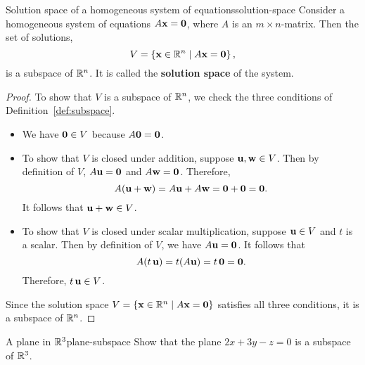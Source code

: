 \begin{proposition}{Solution space of a homogeneous system of equations}{solution-space}
  Consider a homogeneous system of equations $A\vect{x} = \vect{0}$,
  where $A$ is an $m\times n$-matrix. Then the set of solutions,
  \begin{equation*}
    V=\set{\vect{x}\in\R^n \mid A\vect{x} = \vect{0}},
  \end{equation*}
  is a subspace of\/ $\mathbb{R}^n$. It is called the \textbf{solution space} of
  the system.%
\end{proposition}

\begin{proof}
  To show that $V$ is a subspace of\/ $\mathbb{R}^n$, we check the three
  conditions of Definition~\ref{def:subspace}.
  \begin{itemize}
  \item We have $\vect{0}\in V$ because $A\vect{0}=\vect{0}$.
  \item To show that $V$ is closed under addition, suppose
    $\vect{u},\vect{w}\in V$.  Then by definition of $V$,
    $A\vect{u}=\vect{0}$ and $A\vect{w}=\vect{0}$.  Therefore,
    \begin{equation*}
      A(\vect{u}+\vect{w}) = A\vect{u} + A\vect{w} = \vect{0}+\vect{0}
      = \vect{0}.
    \end{equation*}
    It follows that $\vect{u}+\vect{w}\in V$.
  \item To show that $V$ is closed under scalar multiplication,
    suppose $\vect{u}\in V$ and $t$ is a scalar. Then by definition of
    $V$, we have $A\vect{u}=\vect{0}$. It follows that
    \begin{equation*}
      A(t\,\vect{u}) = t(A\vect{u}) = t\,\vect{0} = \vect{0}.
    \end{equation*}
    Therefore, $t\,\vect{u}\in V$.
  \end{itemize}
  Since the solution space
  $V=\set{\vect{x}\in\R^n \mid A\vect{x} = \vect{0}}$ satisfies all
  three conditions, it is a subspace of\/ $\mathbb{R}^n$.
\end{proof}

\begin{example}{A plane in $\mathbb{R}^3$}{plane-subspace}
  Show that the plane $2x+3y-z=0$ is a subspace of\/ $\mathbb{R}^3$.
\end{example}

